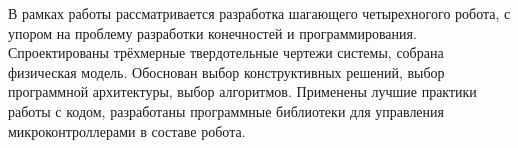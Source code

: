
В рамках работы рассматривается разработка шагающего четырехногого робота, с упором на проблему разработки конечностей и программирования. Спроектированы трёхмерные твердотельные чертежи системы, собрана физическая модель. Обоснован выбор конструктивных решений, выбор программной архитектуры, выбор алгоритмов. Применены лучшие практики работы с кодом, разработаны программные библиотеки для управления микроконтроллерами в составе робота.


